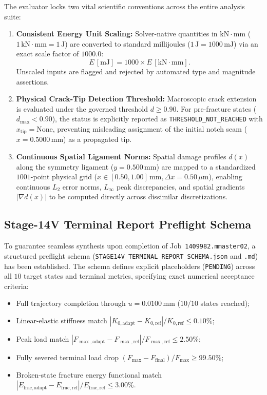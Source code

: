 The evaluator locks two vital scientific conventions across the entire analysis suite:
\begin{enumerate}
    \item \textbf{Consistent Energy Unit Scaling:} Solver-native quantities in $\mathrm{kN}\cdot\mathrm{mm}$ ($1\,\mathrm{kN}\cdot\mathrm{mm} = 1\,\mathrm{J}$) are converted to standard millijoules ($1\,\mathrm{J} = 1000\,\mathrm{mJ}$) via an exact scale factor of $1000.0$:
    \begin{equation}
    E\,[\mathrm{mJ}] = 1000 \times E\,[\mathrm{kN}\cdot\mathrm{mm}].
    \end{equation}
    Unscaled inputs are flagged and rejected by automated type and magnitude assertions.
    \item \textbf{Physical Crack-Tip Detection Threshold:} Macroscopic crack extension is evaluated under the governed threshold $d \ge 0.90$. For pre-fracture states ($d_{\max} < 0.90$), the status is explicitly reported as \texttt{THRESHOLD\_NOT\_REACHED} with $x_{\mathrm{tip}} = \text{None}$, preventing misleading assignment of the initial notch seam ($x = 0.5000\,\mathrm{mm}$) as a propagated tip.
    \item \textbf{Continuous Spatial Ligament Norms:} Spatial damage profiles $d(x)$ along the symmetry ligament ($y = 0.500\,\mathrm{mm}$) are mapped to a standardized $1001$-point physical grid ($x \in [0.50, 1.00]\,\mathrm{mm}, \Delta x = 0.50\,\mu\mathrm{m}$), enabling continuous $L_2$ error norms, $L_\infty$ peak discrepancies, and spatial gradients $|\nabla d(x)|$ to be computed directly across dissimilar discretizations.
\end{enumerate}

\subsection{Stage-14V Terminal Report Preflight Schema}
\label{subsec:stage14uq_terminal_schema}

To guarantee seamless synthesis upon completion of Job~\texttt{1409982.mmaster02}, a structured preflight schema (\texttt{STAGE14V\_TERMINAL\_REPORT\_SCHEMA.json} and \texttt{.md}) has been established. The schema defines explicit placeholders (\texttt{PENDING}) across all $10$ target states and terminal metrics, specifying exact numerical acceptance criteria:
\begin{itemize}
    \item Full trajectory completion through $u = 0.0100\,\mathrm{mm}$ ($10/10$ states reached);
    \item Linear-elastic stiffness match $|K_{0,\mathrm{adapt}} - K_{0,\mathrm{ref}}| / K_{0,\mathrm{ref}} \le 0.10\%$;
    \item Peak load match $|F_{\max,\mathrm{adapt}} - F_{\max,\mathrm{ref}}| / F_{\max,\mathrm{ref}} \le 2.50\%$;
    \item Fully severed terminal load drop $(F_{\max} - F_{\mathrm{final}}) / F_{\max} \ge 99.50\%$;
    \item Broken-state fracture energy functional match $|E_{\mathrm{frac},\mathrm{adapt}} - E_{\mathrm{frac},\mathrm{ref}}| / E_{\mathrm{frac},\mathrm{ref}} \le 3.00\%$.
\end{itemize}

